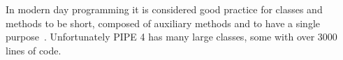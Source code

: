In modern day programming it is considered good practice for classes and methods to be short, composed of auxiliary methods and to have a single purpose~\cite{so_can_a_function_be_too_short}. Unfortunately PIPE 4 has many large classes, some with over \num{3000} lines of code. 